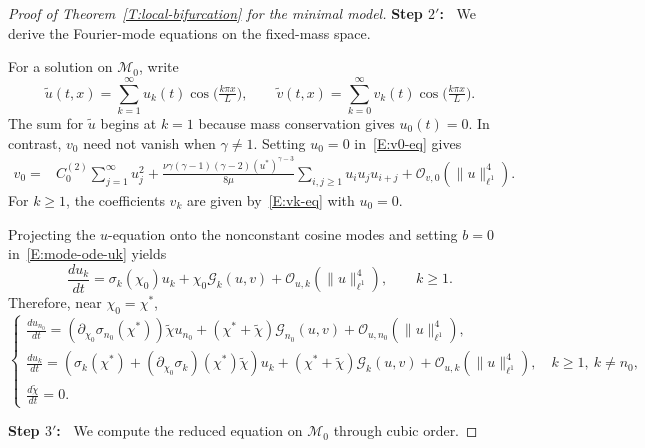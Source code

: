 \documentclass[11pt]{article} %
\theoremstyle{remark}
\theoremstyle{remark}
\numberwithin{equation}{section}
\numberwithin{figure}{section}
\numberwithin{table}{section}
\begin{document}
\begin{proof}[Proof of Theorem~\ref{T:local-bifurcation} for the minimal model]
  \smallskip

  \noindent\textbf{Step $2'$:~} We derive the Fourier-mode equations on the
  fixed-mass space.

  \smallskip

  For a solution on $\mathcal{M}_0$, write
  \[
    \widetilde{u}(t,x)
    =\sum_{k=1}^\infty u_k(t)\cos\Big(\tfrac{k\pi x}{L}\Big),\qquad
    \widetilde{v}(t,x)
    =\sum_{k=0}^\infty v_k(t)\cos\Big(\tfrac{k\pi x}{L}\Big).
  \]
  The sum for $\widetilde{u}$ begins at $k = 1$ because mass conservation gives
  $u_0(t) = 0$. In contrast, $v_0$ need not vanish when $\gamma \ne 1$. Setting
  $u_0 = 0$ in~\eqref{E:v0-eq} gives
  \begin{align*}
    v_0
    ={}&C_0^{(2)}\sum_{j=1}^\infty u_j^2
    +\frac{\nu\gamma(\gamma-1)(\gamma-2)(u^*)^{\gamma-3}}{8\mu}
    \sum_{i,j\ge1}u_i u_j u_{i+j}
    +\mathcal{O}_{v,0}\left(\|u\|_{\ell^1}^4\right).
  \end{align*}
  For $k \ge 1$, the coefficients $v_k$ are given by~\eqref{E:vk-eq} with $u_0 =
  0$.

  Projecting the $u$-equation onto the nonconstant cosine modes and setting $b =
  0$ in~\eqref{E:mode-ode-uk} yields
  \[
    \frac{du_k}{dt}
    =\sigma_k(\chi_0)u_k
    +\chi_0\mathcal{G}_k(u,v)
    +\mathcal{O}_{u,k}\left(\|u\|_{\ell^1}^4\right),\qquad k\ge1.
  \]
  Therefore, near $\chi_0 = \chi^*$,
  \begin{equation}\label{E:ode-chi*-minimal}
    \begin{cases}
      \displaystyle
      \frac{du_{n_0}}{dt}
      =\left(\partial_{\chi_0}\sigma_{n_0}(\chi^*)\right)
      \widetilde{\chi} u_{n_0}
      +(\chi^*+\widetilde{\chi})\mathcal{G}_{n_0}(u,v)
      +\mathcal{O}_{u,n_0}\left(\|u\|_{\ell^1}^4\right),
      \\[3mm]
      \displaystyle
      \frac{du_k}{dt}
      =\left(\sigma_k(\chi^*)
      +(\partial_{\chi_0}\sigma_k)(\chi^*)\widetilde{\chi}\right)u_k
      +(\chi^*+\widetilde{\chi})\mathcal{G}_k(u,v)
      +\mathcal{O}_{u,k}\left(\|u\|_{\ell^1}^4\right),
      \quad k\ge1,\ k\ne n_0,
      \\[3mm]
      \displaystyle
      \frac{d\widetilde{\chi}}{dt}=0.
    \end{cases}
  \end{equation}

  \smallskip

  \noindent\textbf{Step $3'$:~} We compute the reduced equation on
  $\mathcal{M}_0$ through cubic order.


\end{proof}
\end{document}

